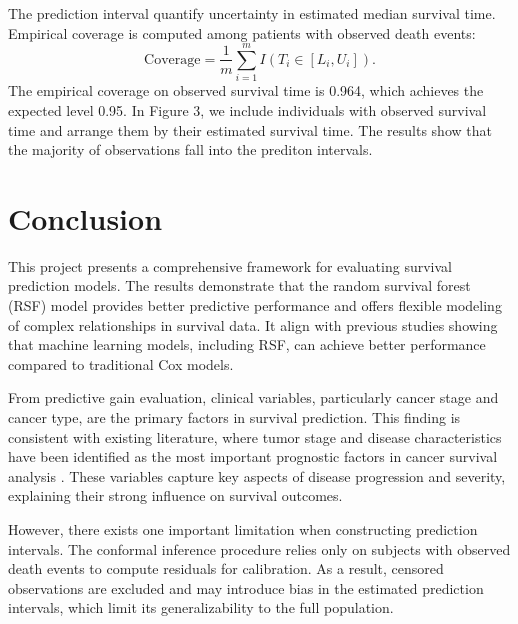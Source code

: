 \documentclass[11pt]{article}
\begin{document}
The prediction interval quantify uncertainty in estimated median survival time. Empirical coverage is computed among patients with observed death events:
\[
\text{Coverage}
=
\frac{1}{m}
\sum_{i=1}^{m}
I(T_i \in [L_i,U_i]).
\]
The empirical coverage on observed survival time is 0.964, which achieves the expected level 0.95. In Figure 3, we include individuals with observed survival time and arrange them by their estimated survival time. The results show that the majority of observations fall into the prediton intervals.

\section{Conclusion}
This project presents a comprehensive framework for evaluating survival prediction models. The results demonstrate that the random survival forest (RSF) model provides better predictive performance and offers flexible modeling of complex relationships in survival data. It align with previous studies showing that machine learning models, including RSF, can achieve better performance compared to traditional Cox models\citep{mao2025rsf, zheng2025comparison}. 

From predictive gain evaluation, clinical variables, particularly cancer stage and cancer type, are the primary factors in survival prediction. This finding is consistent with existing literature, where tumor stage and disease characteristics have been identified as the most important prognostic factors in cancer survival analysis \citep{germer2024survival, mohammed2021predictors}. These variables capture key aspects of disease progression and severity, explaining their strong influence on survival outcomes.

However, there exists one important limitation when constructing prediction intervals. The conformal inference procedure relies only on subjects with observed death events to compute residuals for calibration. As a result, censored observations are excluded and may introduce bias in the estimated prediction intervals, which limit its generalizability to the full population.



\end{document}
